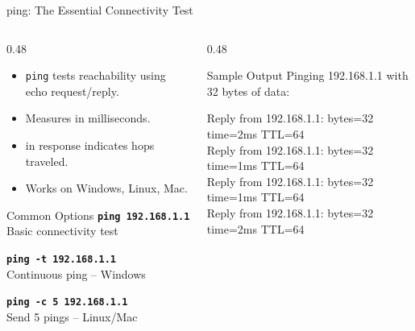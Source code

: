 \documentclass[aspectratio=169]{beamer}  %
\begin{document}
\begin{frame}{ping: The Essential Connectivity Test}
    \begin{columns}[T]
        \begin{column}{0.48\textwidth}
            \begin{itemize}
                \item \texttt{ping} tests reachability using  echo request/reply.
                \item Measures  in milliseconds.
                \item {} in response indicates hops traveled.
                \item Works on Windows, Linux, Mac.
            \end{itemize}
            
            \vspace{0.3em}
            \begin{block}{Common Options}
                \small
                \texttt{\textbf{ping 192.168.1.1}} \\
                Basic connectivity test
                
                \vspace{0.2em}
                \texttt{\textbf{ping -t 192.168.1.1}} \\
                Continuous ping -- Windows
                
                \vspace{0.2em}
                \texttt{\textbf{ping -c 5 192.168.1.1}} \\
                Send 5 pings -- Linux/Mac
            \end{block}
        \end{column}
        \begin{column}{0.48\textwidth}
            \begin{block}{Sample Output}
                \ttfamily\tiny
                Pinging 192.168.1.1 with 32 bytes of data:
                
                \vspace{0.2em}
                Reply from 192.168.1.1: bytes=32 \textcolor{networkgreen}{time=2ms} \textcolor{ipblue}{TTL=64} \\
                Reply from 192.168.1.1: bytes=32 \textcolor{networkgreen}{time=1ms} \textcolor{ipblue}{TTL=64} \\
                Reply from 192.168.1.1: bytes=32 \textcolor{networkgreen}{time=1ms} \textcolor{ipblue}{TTL=64} \\
                Reply from 192.168.1.1: bytes=32 \textcolor{networkgreen}{time=2ms} \textcolor{ipblue}{TTL=64}
            \end{block}
            

\end{column}
\end{columns}
\end{frame}
\end{document}
